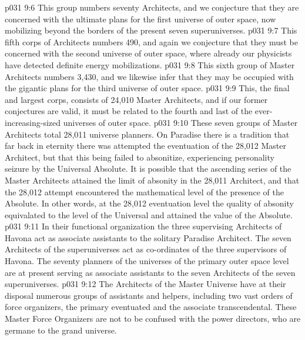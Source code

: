\pc \vs p031 9:6 \bibnobreakspace {} This group numbers seventy Architects, and we conjecture that they are concerned with the ultimate plans for the first universe of outer space, now mobilizing beyond the borders of the present seven superuniverses.
\pc \vs p031 9:7 \bibnobreakspace {} This fifth corps of Architects numbers 490, and again we conjecture that they must be concerned with the second universe of outer space, where already our physicists have detected definite energy mobilizations.
\pc \vs p031 9:8 \bibnobreakspace {} This sixth group of Master Architects numbers 3,430, and we likewise infer that they may be occupied with the gigantic plans for the third universe of outer space.
\pc \vs p031 9:9 \bibnobreakspace {} This, the final and largest corps, consists of 24,010 Master Architects, and if our former conjectures are valid, it must be related to the fourth and last of the ever\hyp{}increasing\hyp{}sized universes of outer space.
\pc \vs p031 9:10 These seven groups of Master Architects total 28,011 universe planners. On Paradise there is a tradition that far back in eternity there was attempted the eventuation of the 28,012 Master Architect, but that this being failed to absonitize, experiencing personality seizure by the Universal Absolute. It is possible that the ascending series of the Master Architects attained the limit of absonity in the 28,011 Architect, and that the 28,012 attempt encountered the mathematical level of the presence of the Absolute. In other words, at the 28,012 eventuation level the quality of absonity equivalated to the level of the Universal and attained the value of the Absolute.\plusone
\pc \vs p031 9:11 In their functional organization the three supervising Architects of Havona act as associate assistants to the solitary Paradise Architect. The seven Architects of the superuniverses act as co\hyp{}ordinates of the three supervisors of Havona. The seventy planners of the universes of the primary outer space level are at present serving as associate assistants to the seven Architects of the seven superuniverses.
\vs p031 9:12 The Architects of the Master Universe have at their disposal numerous groups of assistants and helpers, including two vast orders of force organizers, the primary eventuated and the associate transcendental. These Master Force Organizers are not to be confused with the power directors, who are germane to the grand universe.
